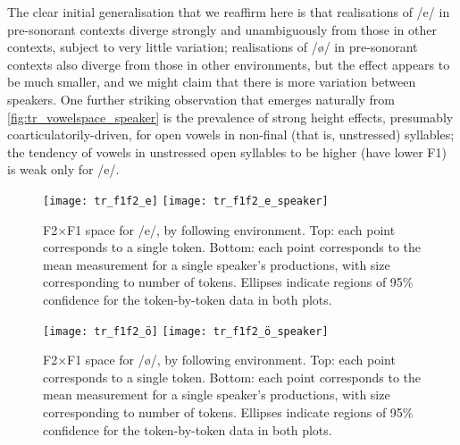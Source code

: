 The clear initial generalisation that we reaffirm here is that realisations of /e/ in pre-sonorant contexts diverge strongly and unambiguously from those in other contexts, subject to very little variation; realisations of /ø/ in pre-sonorant contexts also diverge from those in other environments, but the effect appears to be much smaller, and we might claim that there is more variation between speakers. One further striking observation that emerges naturally from \cref{fig:tr_vowelspace_speaker} is the prevalence of strong height effects, presumably coarticulatorily-driven, for open vowels in non-final (that is, unstressed) syllables; the tendency of vowels in unstressed open syllables to be higher (have lower F1) is weak only for /e/.


%

\begin{figure}[H]
  \centering
  \texttt{[image: tr\_f1f2\_e]}
    \texttt{[image: tr\_f1f2\_e\_speaker]}
  \caption[F2$\times$F1 space for /e/ alone by following environment.]{F2$\times$F1 space for /e/, by following environment. Top: each point corresponds to a single token. Bottom: each point corresponds to the mean measurement for a single speaker's productions, with size corresponding to number of tokens. Ellipses indicate regions of 95\% confidence for the token-by-token data in both plots.}
  \label{fig:tr_e}
\end{figure}

\begin{figure}[H]
  \centering
  \texttt{[image: tr\_f1f2\_ö]}
    \texttt{[image: tr\_f1f2\_ö\_speaker]}
  \caption[F2$\times$F1 space for /\o/ alone by following environment.]{F2$\times$F1 space for /\o/, by following environment. Top: each point corresponds to a single token. Bottom: each point corresponds to the mean measurement for a single speaker's productions, with size corresponding to number of tokens. Ellipses indicate regions of 95\% confidence for the token-by-token data in both plots.}
  \label{fig:tr_ö}
\end{figure}


